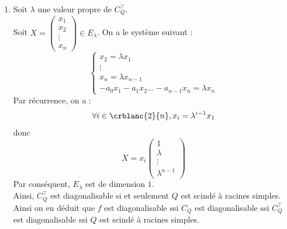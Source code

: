 \documentclass[8pt]{book}
\begin{document}
\begin{enumerate}
\begin{enumerate}[label=\alph*.]
			\item Soit $\lambda$ une valeur propre de $C_Q^\top$.\\
			Soit $X=\begin{pmatrix}
				x_1\\x_2\\ \vdots \\ x_n
			\end{pmatrix}\in E_\lambda$.
			On a le système suivant : 
			\[\left \{
			\begin{array}{rcl}
				x_2=\lambda x_1\\
				\vdots\\
				x_n=\lambda x_{n-1}\\
				-a_0x_1-a_1x_2\dots-a_{n-1}x_n=\lambda x_n
			\end{array}
			\right. \]
			Par récurrence, on a : \[\forall i\in\crblanc{2}{n}, x_i=\lambda^{i-1}x_1\] donc \[X=x_i\begin{pmatrix}
				1\\\lambda\\\vdots\\\lambda^{n-1}
			\end{pmatrix}\]
			Par conséquent, $E_\lambda$ est de dimension $1$.\\
			Ainsi, $C_Q^\top$ est diagonalisable si et seulement $Q$ est scindé à racines simples.\\
			Ainsi on en déduit que $f$ est diagonalisable ssi $C_Q$ est diagonalisable ssi $C_Q^\top$ est diagonalisable ssi $Q$ est scindé à racines simples.
		\end{enumerate}
	\end{enumerate}
\end{document}
